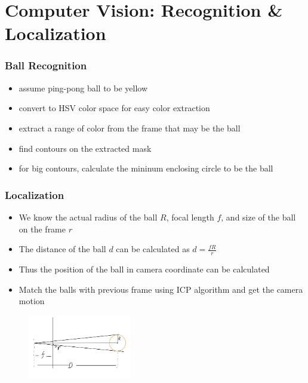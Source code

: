 \documentclass[12pt]{beamer}
\begin{document}
\section{Computer Vision: Recognition \& Localization}
\begin{frame}
    \frametitle{Ball Recognition}
    \begin{itemize}
        \item assume ping-pong ball to be yellow
        \item convert to HSV color space for easy color extraction
        \item extract a range of color from the frame that may be the ball
        \item find contours on the extracted mask
        \item for big contours, calculate the mininum enclosing circle to be the ball
    \end{itemize}
\end{frame}

\begin{frame}
    \frametitle{Localization}
    \begin{itemize}
        \item We know the actual radius of the ball $R$, focal length $f$, and size of the ball on the frame $r$
        \item The distance of the ball $d$ can be calculated as $d = \frac{fR}{r}$
        \item Thus the position of the ball in camera coordinate can be calculated
        \item Match the balls with previous frame using ICP algorithm and get the camera motion
    \end{itemize}
    \begin{figure}[H]
        \centering
        \includegraphics[width=0.4\textwidth]{Picture/ball_distance.jpg}
    \end{figure}
\end{frame}
\end{document}
